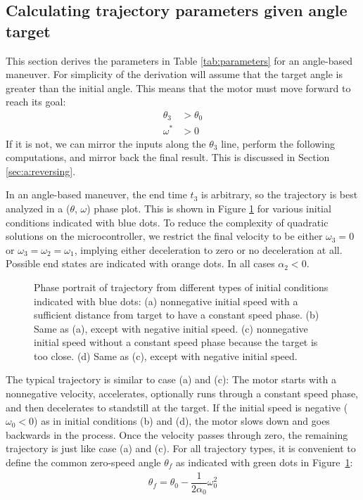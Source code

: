 \documentclass[12pt, a4paper]
{article}
\providecommand{\w}{\omega}
\providecommand{\wt}{\w^*}
\renewcommand{\th}{\theta}
\renewcommand{\a}{\alpha}
\providecommand{\w}{\omega}
\begin{document}
\subsection{Calculating trajectory parameters given angle target}
\label{sec:anglebasedref}
This section derives the parameters in Table \ref{tab:parameters} for an
angle-based maneuver. For simplicity of the derivation will assume that
the target angle  is greater than the initial angle. This
means that the motor must move forward to reach its goal:
%
\begin{align}
    \label{eq:a:forwardmaneuver}
    \th_3 &> \th_0\\
    \wt &> 0
\end{align}
%
If it is not, we can mirror the inputs along the $\th_3$ line, perform the
following computations, and mirror back the final result. This is discussed
in Section \ref{sec:a:reversing}.

In an angle-based maneuver, the end time $t_3$ is arbitrary, so the trajectory
is best analyzed in a ($\th$, $\w$) phase plot. This is shown in Figure
\ref{fig:positions} for various initial conditions indicated with blue dots.
To reduce the complexity of quadratic solutions on the microcontroller, we
restrict the final velocity to be either $\w_3=0$ or $\w_3=\w_2=\w_1$, implying
either deceleration to zero or no deceleration at all. Possible end states are
indicated with orange dots. In all cases $\a_2 < 0$.


\begin{figure}[H]
    \centering
    
    \caption{
        Phase portrait of trajectory from different types of initial conditions
        indicated with blue dots:
        (a) nonnegative initial speed with a
        sufficient distance from target to have a constant speed phase.
        (b) Same as (a), except with negative initial speed.
        (c) nonnegative initial speed without a constant speed phase because
        the target is too close.
        (d) Same as (c), except with negative initial speed.
        \label{fig:positions}}
\end{figure}


The typical trajectory is similar to case (a) and (c): The motor starts
with a nonnegative velocity, accelerates, optionally runs through a constant
speed phase, and then decelerates to standstill at the target.
If the initial speed is negative ($\w_0 < 0$) as in initial conditions (b)
and (d), the motor slows down and goes backwards in the process. Once the
velocity passes through zero, the remaining trajectory is just like case (a)
and (c). For all trajectory types, it is convenient to define the common
zero-speed angle $\th_f$ as indicated
with green dots in Figure~\ref{fig:positions}:
%
\begin{align}
    \th_f = \th_0 - \dfrac{1}{2 \a_0}\w_0^2
\end{align}
\end{document}
